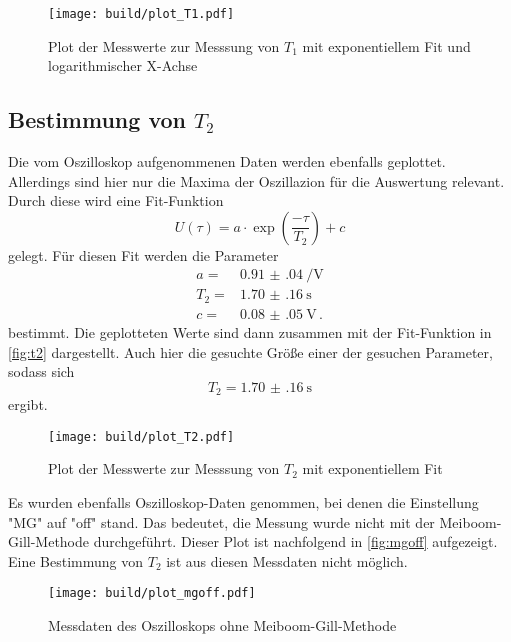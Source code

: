 \begin{figure}
    \centering
    \texttt{[image: build/plot\_T1.pdf]}
    \caption{Plot der Messwerte zur Messsung von $T_1$ mit exponentiellem Fit und logarithmischer X-Achse}
    \label{fig:t1}
\end{figure}

\subsection{Bestimmung von \texorpdfstring{$T_2$}{T2}}
\label{ssec:aus2}

Die vom Oszilloskop aufgenommenen Daten werden ebenfalls geplottet.
Allerdings sind hier nur die Maxima der Oszillazion für die Auswertung relevant.
Durch diese wird eine Fit-Funktion 
\begin{equation}
    U(\tau) = a \cdot \exp(\frac{- \tau}{T_2}) + c 
    \label{eq:fit_t2}
\end{equation}
gelegt.
Für diesen Fit werden die Parameter 
\begin{align*}
    a =& \SI{0.91(04)}{\per\volt} \\
    T_2 =& \SI{1.70(16)}{\second} \\
    c =& \SI{0.08(05)}{\volt} \, .
\end{align*}
bestimmt.
Die geplotteten Werte sind dann zusammen mit der Fit-Funktion in \autoref{fig:t2} dargestellt.
Auch hier die gesuchte Größe einer der gesuchen Parameter, sodass sich 
\begin{equation}
    T_2 = \SI{1.70(16)}{\second} 
    \label{eq:t2_wert}
\end{equation}
ergibt.
\begin{figure}
    \centering
    \texttt{[image: build/plot\_T2.pdf]}
    \caption{Plot der Messwerte zur Messsung von $T_2$ mit exponentiellem Fit}
    \label{fig:t2}
\end{figure}

Es wurden ebenfalls Oszilloskop-Daten genommen, bei denen die Einstellung "MG" auf "off" stand.
Das bedeutet, die Messung wurde nicht mit der Meiboom-Gill-Methode durchgeführt.
Dieser Plot ist nachfolgend in \autoref{fig:mgoff} aufgezeigt.
Eine Bestimmung von $T_2$ ist aus diesen Messdaten nicht möglich.

\begin{figure}
    \centering
    \texttt{[image: build/plot\_mgoff.pdf]}
    \caption{Messdaten des Oszilloskops ohne Meiboom-Gill-Methode}
    \label{fig:mgoff}
\end{figure}

